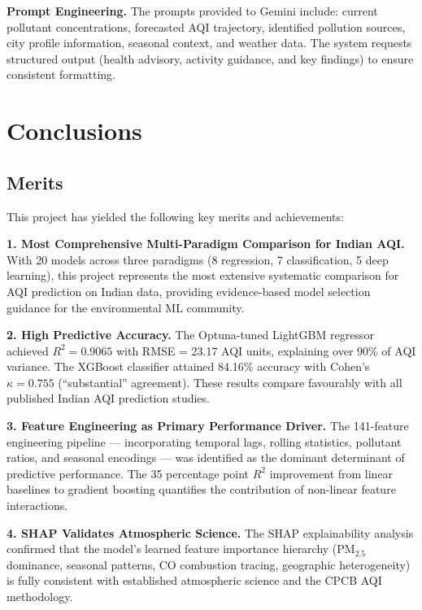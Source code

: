 \documentclass[12pt,a4paper]{report}
\begin{document}
\textbf{Prompt Engineering.} The prompts provided to Gemini include: current pollutant concentrations, forecasted AQI trajectory, identified pollution sources, city profile information, seasonal context, and weather data. The system requests structured output (health advisory, activity guidance, and key findings) to ensure consistent formatting.

\clearpage
\chapter{Conclusions}\label{idx:ch8}

\section{Merits}\label{idx:s81}

This project has yielded the following key merits and achievements:

\textbf{1. Most Comprehensive Multi-Paradigm Comparison for Indian AQI.} With 20 models across three paradigms (8 regression, 7 classification, 5 deep learning), this project represents the most extensive systematic comparison for AQI prediction on Indian data, providing evidence-based model selection guidance for the environmental ML community.

\textbf{2. High Predictive Accuracy.} The Optuna-tuned LightGBM regressor achieved $R^2 = 0.9065$ with RMSE = 23.17 AQI units, explaining over 90\% of AQI variance. The XGBoost classifier attained 84.16\% accuracy with Cohen's $\kappa = 0.755$ (``substantial'' agreement). These results compare favourably with all published Indian AQI prediction studies.

\textbf{3. Feature Engineering as Primary Performance Driver.} The 141-feature engineering pipeline --- incorporating temporal lags, rolling statistics, pollutant ratios, and seasonal encodings --- was identified as the dominant determinant of predictive performance. The 35 percentage point $R^2$ improvement from linear baselines to gradient boosting quantifies the contribution of non-linear feature interactions.

\textbf{4. SHAP Validates Atmospheric Science.} The SHAP explainability analysis confirmed that the model's learned feature importance hierarchy (PM$_{2.5}$ dominance, seasonal patterns, CO combustion tracing, geographic heterogeneity) is fully consistent with established atmospheric science and the CPCB AQI methodology.
\end{document}
